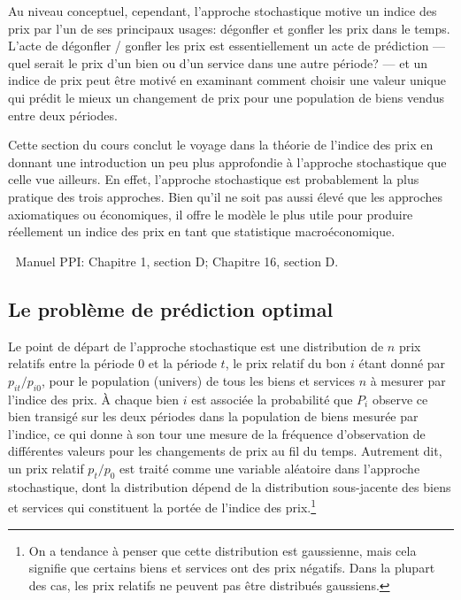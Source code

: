 \documentclass[]{article}
\begin{document}
Au niveau conceptuel, cependant, l'approche stochastique motive un indice des prix par l'un de ses principaux usages: dégonfler et gonfler les prix dans le temps. L'acte de dégonfler / gonfler les prix est essentiellement un acte de prédiction --- quel serait le prix d'un bien ou d'un service dans une autre période? --- et un indice de prix peut être motivé en examinant comment choisir une valeur unique qui prédit le mieux un changement de prix pour une population de biens vendus entre deux périodes.

Cette section du cours conclut le voyage dans la théorie de l'indice des prix en donnant une introduction un peu plus approfondie à l'approche stochastique que celle vue ailleurs. En effet, l'approche stochastique est probablement la plus pratique des trois approches. Bien qu'il ne soit pas aussi élevé que les approches axiomatiques ou économiques, il offre le modèle le plus utile pour produire réellement un indice des prix en tant que statistique macroéconomique.

📖 Manuel PPI: Chapitre 1, section D; Chapitre 16, section D.

\hypertarget{le-probluxe8me-de-pruxe9diction-optimal}{%
\subsection{Le problème de prédiction optimal}\label{le-probluxe8me-de-pruxe9diction-optimal}}

Le point de départ de l'approche stochastique est une distribution de \(n\) prix relatifs entre la période 0 et la période \(t\), le prix relatif du bon \(i\) étant donné par \(p_{it} / p_{i0}\), pour le population (univers) de tous les biens et services \(n\) à mesurer par l'indice des prix. À chaque bien \(i\) est associée la probabilité que \(P_{i}\) observe ce bien transigé sur les deux périodes dans la population de biens mesurée par l'indice, ce qui donne à son tour une mesure de la fréquence d'observation de différentes valeurs pour les changements de prix au fil du temps. Autrement dit, un prix relatif \(p_{t} / p_{0}\) est traité comme une variable aléatoire dans l'approche stochastique, dont la distribution dépend de la distribution sous-jacente des biens et services qui constituent la portée de l'indice des prix.\footnote{On a tendance à penser que cette distribution est gaussienne, mais cela signifie que certains biens et services ont des prix négatifs. Dans la plupart des cas, les prix relatifs ne peuvent pas être distribués gaussiens.}
\end{document}
